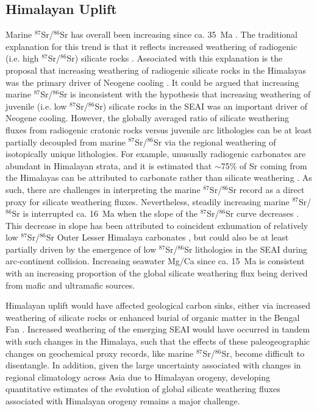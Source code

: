 \documentclass[9pt,twocolumn,twoside,lineno]{pnas-new}
\newcommand{\SrSr}{$^{87}$Sr/$^{86}$Sr\xspace}
\begin{document}
\begin{figure}[h!]
    \label{fig:weatherability_curves}
\end{figure}

\subsection*{Himalayan Uplift}

Marine \SrSr has overall been increasing since ca. 35~Ma \cite{McArthur2012a}. The traditional explanation for this trend is that it reflects increased weathering of radiogenic (i.e. high \SrSr) silicate rocks \cite{Raymo1988a}. Associated with this explanation is the proposal that increasing weathering of radiogenic silicate rocks in the Himalayas was the primary driver of Neogene cooling \cite{Raymo1992a, Edmond1992a}. It could be argued that increasing marine \SrSr is inconsistent with the hypothesis that increasing weathering of juvenile (i.e. low \SrSr) silicate rocks in the SEAI was an important driver of Neogene cooling. However, the globally averaged ratio of silicate weathering fluxes from radiogenic cratonic rocks versus juvenile arc lithologies can be at least partially decoupled from marine \SrSr via the regional weathering of isotopically unique lithologies. For example, unusually radiogenic carbonates are abundant in Himalayan strata, and it is estimated that $\sim$75\% of Sr coming from the Himalayas can be attributed to carbonate rather than silicate weathering \cite{Jacobson2002a, Quade2003a, Oliver2003a}. As such, there are challenges in interpreting the marine \SrSr record as a direct proxy for silicate weathering fluxes. Nevertheless, steadily increasing marine \SrSr is interrupted ca. 16~Ma when the slope of the \SrSr curve decreases \cite{McArthur2012a}. This decrease in slope has been attributed to coincident exhumation of relatively low \SrSr Outer Lesser Himalaya carbonates \cite{Myrow2015a, Colleps2018a}, but could also be at least partially driven by the emergence of low \SrSr lithologies in the SEAI during arc-continent collision. Increasing seawater Mg/Ca since ca. 15~Ma \cite{Higgins2012a} is consistent with an increasing proportion of the global silicate weathering flux being derived from mafic and ultramafic sources.

Himalayan uplift would have affected geological carbon sinks, either via increased weathering of silicate rocks \cite{Raymo1992a} or enhanced burial of organic matter in the Bengal Fan \cite{Galy2007a}. Increased weathering of the emerging SEAI would have occurred in tandem with such changes in the Himalaya, such that the effects of these paleogeographic changes on geochemical proxy records, like marine \SrSr, become difficult to disentangle. In addition, given the large uncertainty associated with changes in regional climatology across Asia due to Himalayan orogeny, developing quantitative estimates of the evolution of global silicate weathering fluxes associated with Himalayan orogeny remains a major challenge.
\end{document}
